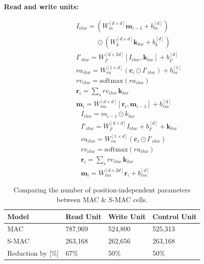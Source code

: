 \documentclass[paperwidth=36in,paperheight=48in,portrait,fontscale=0.36]{baposter}
\newcommand{\cc}{\mathbf{c}}
\newcommand{\kb}{\mathbf{k}}
\newcommand{\mem}{\mathbf{m}}
\newcommand{\rr}{\mathbf{r}}
\begin{document}
\begin{poster}
{\noindent\textbf{Read and write units:}
\begin{multicols}{2}
	\noindent
	\begin{align*}
		&I_{ihw} = (W_{m}^{[d \times d]} \mem_{i-1} + b_{m}^{[d]}) \\
		& \qquad \quad \odot (W_{k}^{[d \times d]} \kb_{hw} + b_{k}^{[d]}) \tag{r1} \\
		&I'_{ihw} =  W_{I'}^{[d \times 2d]} [I_{ihw},\kb_{hw}]  + b_{I'}^{[d]}  \tag{r2} \\
		&ra_{ihw} = W_{ra}^{[1 \times d]} (\cc_i \odot I'_{ihw}) + b_{ra}^{[1]} \tag{r3.1}\\
		&rv_{ihw} = \textrm{softmax}(ra_{ihw}) \tag{r3.2}\\
		&\rr_i = \sum_s rv_{ihw} \, \kb_{hw}  \tag{r3.3}\\
		&\mem_i = W_{rm}^{[d \times d]} [\rr_i, \mem_{i-1}]  + b_{rm}^{[d]} \tag{w1}
	\end{align*}
	\columnbreak
	{\begin{align*}
		&I_{ihw} = m _{i-1} \odot k _{hw} \tag{r1} \\ 
		&I'_{ihw} = W_{I'}^{[d \times d]} I_{ihw} + b_{I'}^{[d]} + \kb_{hw} \tag{r2} \\
		&ra_{ihw} = W_{ra}^{[1 \times d]} (\cc_i \odot I'_{ihw})  \tag{r3.1}\\
		&rv_{ihw} = \textrm{softmax}(ra_{ihw}) \tag{r3.2}\\
		&\rr_i = \sum_s rv_{ihw} \, \kb_{hw}  \tag{r3.3}\\
		&\mem_i = W_{rm}^{[d \times 2d]} \rr_i + b_{rm}^{[d]} \tag{w1}
	\end{align*}}
\end{multicols}

\vspace{-15pt}
\begin{table}[H]
	\centering
	\caption{Comparing the number of position-independent parameters between MAC \& S-MAC cells.}
	\begin{tabular}{llll}
		\toprule
		Model        & Read Unit               & Write Unit &  Control Unit         \\
		\midrule
		MAC   &  787,969 &  524,800        &    525,313    \\
		S-MAC & 263,168  & 262,656       &    263,168 \\
		\midrule
		Reduction by [\%]  & 67\%  &   50\%       &      50\%  \\
		\bottomrule
	\end{tabular}
	\label{tab:mac_cell_parameters}
\end{table}

}
\end{poster}
\end{document}
